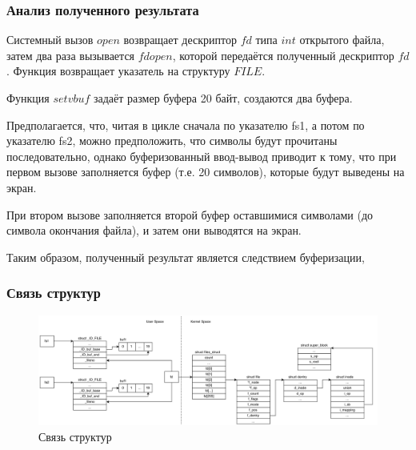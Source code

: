 \subsubsection*{Анализ полученного результата}

Системный вызов $open$ возвращает дескриптор $fd$ типа $int$ открытого файла, затем два раза вызывается $fdopen$, которой передаётся полученный дескриптор $fd$. Функция возвращает указатель на структуру $FILE$.

Функция $setvbuf$ задаёт размер буфера 20 байт, создаются два буфера.

%


Предполагается, что, читая в цикле сначала по указателю fs1, а потом по указателю fs2, можно предположить, что символы будут прочитаны последовательно, однако буферизованный ввод-вывод приводит к тому, что при первом вызове заполняется буфер (т.е. 20 символов), которые будут выведены на экран.

При втором вызове заполняется второй буфер оставшимися символами (до символа окончания файла), и затем они выводятся на экран.

Таким образом, полученный результат является следствием буферизации,

\subsubsection*{Связь структур}


\begin{figure}[h]
	\centering
	\captionsetup{justification=centering}
	\includegraphics[width=160mm]{img/prog1_diagram.png}
	\caption{Связь структур}
	\label{fig:prog-1-diagram}
\end{figure}

